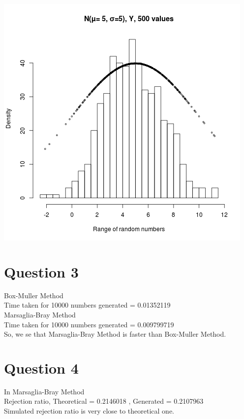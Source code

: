 \documentclass{article}
\begin{document}
\includegraphics{"plot4_2_Y"}
\pagebreak


\section{Question 3}
Box-Muller Method\\
Time taken for 10000 numbers generated =  0.01352119 \\

Marsaglia-Bray Method\\
Time taken for 10000 numbers generated =  0.009799719 \\

So, we se that Marsaglia-Bray Method is faster than Box-Muller Method.\\


\section{Question 4}
In Marsaglia-Bray Method\\
Rejection ratio, Theoretical =  0.2146018 , Generated =  0.2107963 \\
Simulated rejection ratio is very close to theoretical one.
\end{document}
